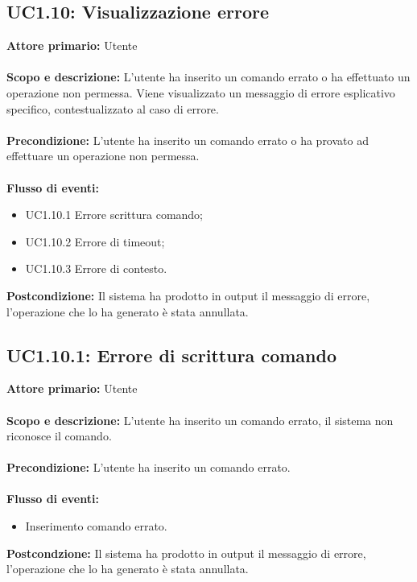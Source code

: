 \documentclass{scalatekids-article}
\begin{document}
\subsection{UC1.10: Visualizzazione errore}
\textbf{Attore primario:} Utente \\ \\
\textbf{Scopo e descrizione:} L'utente ha inserito un comando errato o ha effettuato un operazione non permessa. Viene visualizzato un messaggio di errore esplicativo specifico, contestualizzato al caso di errore.\\ \\
\textbf{Precondizione:} L'utente ha inserito un comando errato o ha provato ad effettuare un operazione non permessa.\\ \\
\textbf{Flusso di eventi:}
\begin{itemize}
\item UC1.10.1 Errore scrittura comando;
\item UC1.10.2 Errore di timeout;
\item UC1.10.3 Errore di contesto.
\end{itemize}
\textbf{Postcondizione:} Il sistema ha prodotto in output il messaggio di errore, l'operazione che lo ha generato è stata annullata.
\subsection{UC1.10.1: Errore di scrittura comando}
\textbf{Attore primario:} Utente \\ \\
\textbf{Scopo e descrizione:} L'utente ha inserito un comando errato, il sistema non riconosce il comando.\\ \\
\textbf{Precondizione:} L'utente ha inserito un comando errato.\\ \\
\textbf{Flusso di eventi:}
\begin{itemize}
\item Inserimento comando errato.
\end{itemize}
\textbf{Postcondzione:} Il sistema ha prodotto in output il messaggio di errore, l'operazione che lo ha generato è stata annullata.
\end{document}
